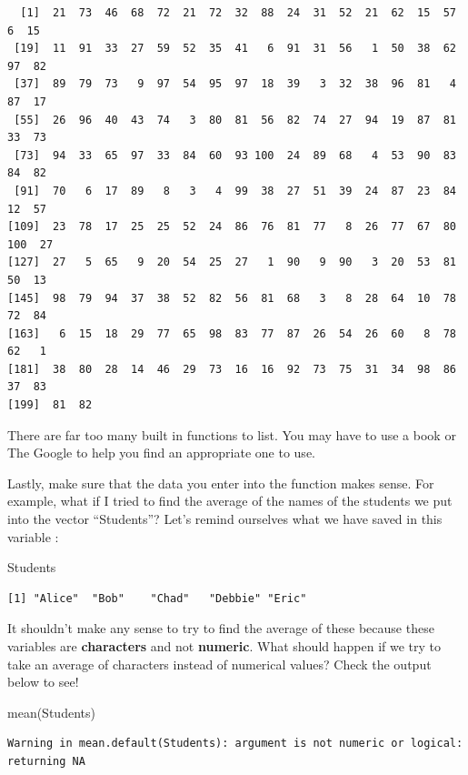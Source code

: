 \documentclass[
  letterpaper,
  DIV=11,
  numbers=noendperiod]{scrreprt}
\newenvironment{Shaded}{\begin{snugshade}}{\end{snugshade}}
\newcommand{\FunctionTok}[1]{\textcolor[rgb]{0.28,0.35,0.67}{#1}}
\newcommand{\NormalTok}[1]{\textcolor[rgb]{0.00,0.23,0.31}{#1}}
\begin{document}
\begin{verbatim}
  [1]  21  73  46  68  72  21  72  32  88  24  31  52  21  62  15  57   6  15
 [19]  11  91  33  27  59  52  35  41   6  91  31  56   1  50  38  62  97  82
 [37]  89  79  73   9  97  54  95  97  18  39   3  32  38  96  81   4  87  17
 [55]  26  96  40  43  74   3  80  81  56  82  74  27  94  19  87  81  33  73
 [73]  94  33  65  97  33  84  60  93 100  24  89  68   4  53  90  83  84  82
 [91]  70   6  17  89   8   3   4  99  38  27  51  39  24  87  23  84  12  57
[109]  23  78  17  25  25  52  24  86  76  81  77   8  26  77  67  80 100  27
[127]  27   5  65   9  20  54  25  27   1  90   9  90   3  20  53  81  50  13
[145]  98  79  94  37  38  52  82  56  81  68   3   8  28  64  10  78  72  84
[163]   6  15  18  29  77  65  98  83  77  87  26  54  26  60   8  78  62   1
[181]  38  80  28  14  46  29  73  16  16  92  73  75  31  34  98  86  37  83
[199]  81  82
\end{verbatim}

There are far too many built in functions to list. You may have to use a
book or The Google to help you find an appropriate one to use.

Lastly, make sure that the data you enter into the function makes sense.
For example, what if I tried to find the average of the names of the
students we put into the vector ``Students''? Let's remind ourselves
what we have saved in this variable :

\begin{Shaded}
\begin{Highlighting}[]
\NormalTok{Students}
\end{Highlighting}
\end{Shaded}

\begin{verbatim}
[1] "Alice"  "Bob"    "Chad"   "Debbie" "Eric"  
\end{verbatim}

It shouldn't make any sense to try to find the average of these because
these variables are \textbf{characters} and not \textbf{numeric}. What
should happen if we try to take an average of characters instead of
numerical values? Check the output below to see!

\begin{Shaded}
\begin{Highlighting}[]
\FunctionTok{mean}\NormalTok{(Students)}
\end{Highlighting}
\end{Shaded}

\begin{verbatim}
Warning in mean.default(Students): argument is not numeric or logical:
returning NA
\end{verbatim}
\end{document}
